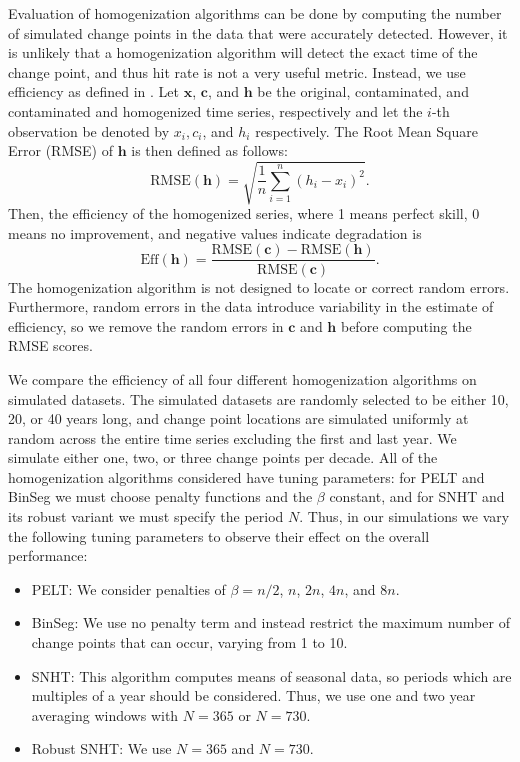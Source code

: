 \documentclass[12pt]{article}
\begin{document}
\begin{doublespacing}

Evaluation of homogenization algorithms can be done by computing the number of simulated change points in the data that were accurately detected.  However, it is unlikely that a homogenization algorithm will detect the exact time of the change point, and thus hit rate is not a very useful metric.  Instead, we use efficiency as defined in \cite{domonkos13}.  Let $\mathbf{x}$, $\mathbf{c}$, and $\mathbf{h}$ be the original, contaminated, and contaminated and homogenized time series, respectively and let the $i$-th observation be denoted by $x_i, c_i$, and $h_i$ respectively.  The Root Mean Square Error (RMSE) of $\mathbf{h}$ is then defined as follows:
\begin{equation*}
	\mbox{RMSE}(\mathbf{h}) = \sqrt{\frac{1}{n} \sum_{i=1}^n (h_i-x_i)^2}.
\end{equation*}
Then, the efficiency of the homogenized series, where 1 means perfect skill, 0 means no improvement, and negative values indicate degradation is
\begin{equation*}
	\mbox{Eff}(\mathbf{h}) = \frac{\mbox{RMSE}(\mathbf{c})-\mbox{RMSE}(\mathbf{h})}{\mbox{RMSE}(\mathbf{c})}.
\end{equation*}
The homogenization algorithm is not designed to locate or correct random errors.  Furthermore, random errors in the data introduce variability in the estimate of efficiency, so we remove the random errors in $\mathbf{c}$ and $\mathbf{h}$ before computing the RMSE scores.  

We compare the efficiency of all four different homogenization algorithms on simulated datasets.  The simulated datasets are randomly selected to be either  10, 20, or 40 years long, and change point locations are simulated uniformly at random across the entire time series excluding the first and last year.  We simulate either one, two, or three change points per decade.  All of the homogenization algorithms considered have tuning parameters: for PELT and BinSeg we must choose penalty functions and the $\beta$ constant, and for SNHT and its robust variant we must specify the period $N$.  Thus, in our simulations we vary the following tuning parameters to observe their effect on the overall performance:

\begin{itemize}
	\item PELT: We consider penalties of $\beta=n/2$, $n$, $2n$, $4n$, and  $8n$.
	\item BinSeg: We use no penalty term and instead restrict the maximum number of change points that can occur, varying from 1 to 10.
	\item SNHT: This algorithm computes means of seasonal data, so periods which are multiples of a year should be considered.  Thus, we use one and two year averaging windows with $N=365$ or $N=730$.
	\item Robust SNHT: We  use $N=365$ and $N= 730$.
\end{itemize}






\end{doublespacing}
\end{document}
